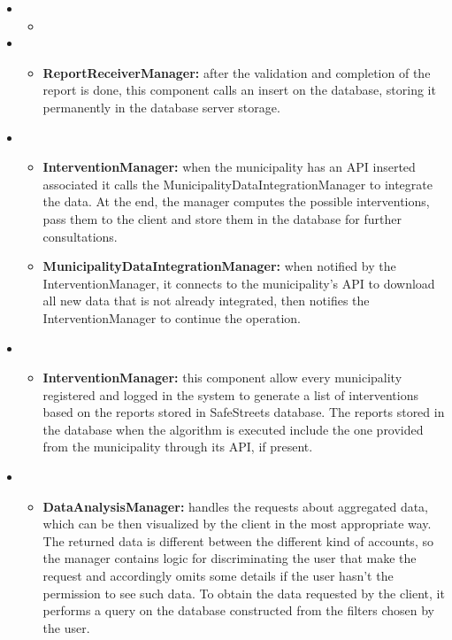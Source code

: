 \bigskip
\begin{itemize}[label={}]
	\item {}
	\begin{itemize}
		\item 
	\end{itemize}
	\item {}
	\begin{itemize}
		\item \textbf{ReportReceiverManager:} after the validation and completion of the report is done, this component calls an insert on the database, storing it permanently in the database server storage.
	\end{itemize}
	\item {}
	\begin{itemize}
		\item \textbf{InterventionManager:}  when the municipality has an API inserted associated it calls the MunicipalityDataIntegrationManager to integrate the data. At the end, the manager computes the possible interventions, pass them to the client and store them in the database for further consultations.
		\item \textbf{MunicipalityDataIntegrationManager:} when notified by the InterventionManager, it connects to the municipality's API to download all new data that is not already integrated, then notifies the InterventionManager to continue the operation.
	\end{itemize}
	\item {}
	\begin{itemize}
		\item \textbf{InterventionManager:} this component allow every municipality registered and logged in the system to generate a list of interventions based on the reports stored in SafeStreets database. The reports stored in the database when the algorithm is executed include the one provided from the municipality through its API, if present.
	\end{itemize}
	\item {}
	\begin{itemize}
		\item \textbf{DataAnalysisManager:} handles the requests about aggregated data, which can be then visualized by the client in the most appropriate way. The returned data is different between the different kind of accounts, so the manager contains logic for discriminating the user that make the request and accordingly omits some details if the user hasn't the permission to see such data. To obtain the data requested by the client, it performs a query on the database constructed from the filters chosen by the user.

\end{itemize}
\end{itemize}
